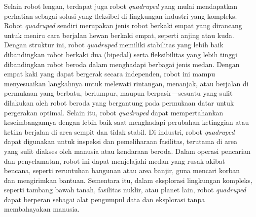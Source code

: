 Selain robot lengan, terdapat juga robot \emph{quadruped} yang mulai mendapatkan perhatian sebagai
solusi yang fleksibel di lingkungan industri yang kompleks.
Robot \emph{quadruped} sendiri merupakan jenis robot berkaki empat yang dirancang untuk meniru
cara berjalan hewan berkaki empat, seperti anjing atau kuda.
Dengan struktur ini, robot \emph{quadruped} memiliki stabilitas yang lebih baik
dibandingkan robot berkaki dua (bipedal) serta fleksibilitas yang lebih tinggi
dibandingkan robot beroda dalam menghadapi berbagai jenis medan\parencite{LeiWu_doassfqrbog}.
Dengan empat kaki yang dapat bergerak secara independen, robot ini mampu menyesuaikan
langkahnya untuk melewati rintangan, menanjak, atau berjalan di permukaan yang berbatu,
berlumpur, maupun berpasir—sesuatu yang sulit dilakukan oleh robot beroda yang bergantung
pada permukaan datar untuk pergerakan optimal. Selain itu, robot \emph{quadruped} dapat
mempertahankan keseimbangannya dengan lebih baik saat menghadapi perubahan ketinggian
atau ketika berjalan di area sempit dan tidak stabil.
Di industri, robot \emph{quadruped} dapat digunakan untuk inspeksi dan pemeliharaan fasilitas,
terutama di area yang sulit diakses oleh manusia atau kendaraan beroda.
Dalam operasi pencarian dan penyelamatan, robot ini dapat menjelajahi medan yang rusak akibat bencana,
seperti reruntuhan bangunan atau area banjir, guna mencari korban dan mengirimkan bantuan.
Sementara itu, dalam eksplorasi lingkungan kompleks, seperti tambang bawah tanah,
fasilitas nuklir, atau planet lain, robot \emph{quadruped} dapat berperan
sebagai alat pengumpul data dan eksplorasi tanpa membahayakan manusia.

